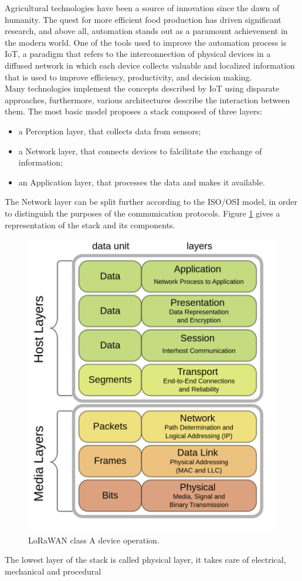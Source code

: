 Agricultural technologies have been a source of innovation since the dawn of humanity. The quest for more efficient food
production has driven significant research, and above all, automation stands out as a paramount achievement in the
modern world. One of the tools used to improve the automation process is \gls{IoT}, a paradigm that refers to the interconnection
of physical devices in a diffused network in which each device collects valuable and localized information that is used to
improve efficiency, productivity, and decision making.\\
Many technologies implement the concepts described by \gls{IoT} using disparate approaches, furthermore, various
architectures describe the interaction between them. The most basic model proposes a stack composed of three layers:
\begin{itemize}
    \item a Perception layer, that collects data from sensors;
    \item a Network layer, that connects devices to falcilitate the exchange of information;
    \item an Application layer, that processes the data and makes it available.
\end{itemize}
The Network layer can be split further according to the \gls{ISO/OSI} model, in order to distinguish the purposes of the
communication protocols. Figure \ref{img: iso_osi} gives a representation of the stack and its components.
\begin{figure}[ht]
    \centering
    \includegraphics[width=0.5\linewidth]{images/iso_osi.png}
    \caption{LoRaWAN class A device operation.}
    \label{img: iso_osi}
\end{figure}
The lowest layer of the stack is called physical layer, it takes care of electrical, mechanical and procedural
